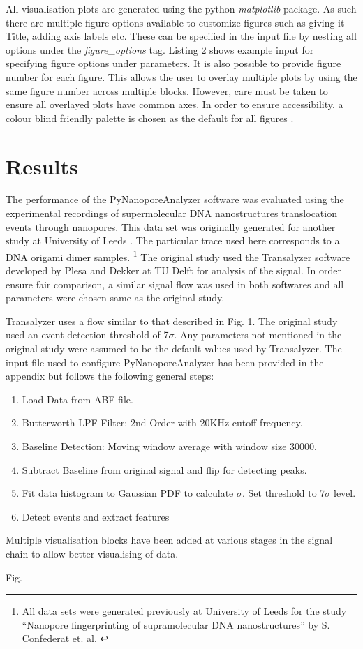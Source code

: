 \documentclass[journal]{IEEEtran}
\begin{document}
All visualisation plots are generated using the python \textit{matplotlib} package. As such there are multiple figure options available to customize figures such as giving it Title, adding axis labels etc. These can be specified in the input file by nesting all options under the \textit{figure\_options} tag. Listing 2 shows example input for specifying figure options under parameters. It is also possible to provide figure number for each figure. This allows the user to overlay multiple plots by using the same figure number across multiple blocks. However, care must be taken to ensure all overlayed plots have common axes. In order to ensure accessibility, a colour blind friendly palette is chosen as the default for all figures \cite{ichiharaColorUniversalDesign2008}.

\section{Results}
The performance of the PyNanoporeAnalyzer software was evaluated using the experimental recordings of supermolecular DNA nanostructures translocation events through nanopores. This data set was originally generated for another study at University of Leeds \cite{confederatNanoporeFingerprintingSupramolecular2022}. The particular trace used here corresponds to a DNA origami dimer samples. \footnote[1]{All data sets  were generated previously at University of Leeds for the study “Nanopore fingerprinting of supramolecular DNA nanostructures” by S. Confederat et. al. \cite{confederatNanoporeFingerprintingSupramolecular2022}} The original study used the Transalyzer software developed by Plesa and Dekker at TU Delft \cite{plesaDataAnalysisMethods2015} for analysis of the signal. In order ensure fair comparison, a similar signal flow was used in both softwares and all parameters were chosen same as the original study.

Transalyzer uses a flow similar to that described in Fig. 1. The original study used an event detection threshold of 7$\sigma$. Any parameters not mentioned in the original study were assumed to be the default values used by Transalyzer. The input file used to configure PyNanoporeAnalyzer has been provided in the appendix but follows the following general steps:
\begin{enumerate}{}{}
    \item {Load Data from ABF file.}
    \item {Butterworth LPF Filter: 2nd Order with 20KHz cutoff frequency.}
    \item {Baseline Detection: Moving window average with window size 30000.}
    \item {Subtract Baseline from original signal and flip for detecting peaks.}
    \item {Fit data histogram to Gaussian PDF to calculate $\sigma$. Set threshold to 7$\sigma$ level.}
    \item {Detect events and extract features}
\end{enumerate}
Multiple visualisation blocks have been added at various stages in the signal chain to allow better visualising of data.

Fig.




\end{document}
